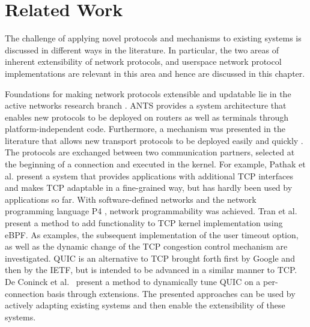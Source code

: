 \section{Related Work}
\label{sec:releted_work}
The challenge of applying novel protocols and mechanisms to existing systems is discussed in different ways in the literature. 
In particular, the two areas of inherent extensibility of network protocols, and userspace network protocol implementations are relevant in this area and hence are discussed in this chapter. 

Foundations for making network protocols extensible and updatable lie in the active networks research branch \cite{A3:tennenhouse1996towards, A3:tennenhouse1997survey}.
ANTS \cite{A3:wetherall1998ants} provides a system architecture that enables new protocols to be deployed on routers as well as terminals through platform-independent code.
Furthermore, a mechanism was presented in the literature that allows new transport protocols to be deployed easily and quickly \cite{A3:patel2003upgrading}. 
The protocols are exchanged between two communication partners, selected at the beginning of a connection and executed in the kernel.
For example, Pathak et al. \cite{A3:pathak2015modnet} present a system that provides applications with additional TCP interfaces and makes TCP adaptable in a fine-grained way, but has hardly been used by applications so far.
With software-defined networks \cite{A3:mckeown2008openflow} and the network programming language P4 \cite{A3:bosshart2014p4}, network programmability was achieved. 
Tran et al.~\cite{A3:tran2019beyond} present a method to add functionality to TCP kernel implementation using eBPF. 
As examples, the subsequent implementation of the user timeout option, as well as the dynamic change of the TCP congestion control mechanism are investigated.
QUIC is an alternative to TCP brought forth first by Google and then by the IETF, but is intended to be advanced in a similar manner to TCP.
De Coninck et al.~\cite{A3:de2019pluginizing,A3:de2018tuning} present a method to dynamically tune QUIC on a per-connection basis through extensions. 
The presented approaches can be used by actively adapting existing systems and then enable the extensibility of these systems.



